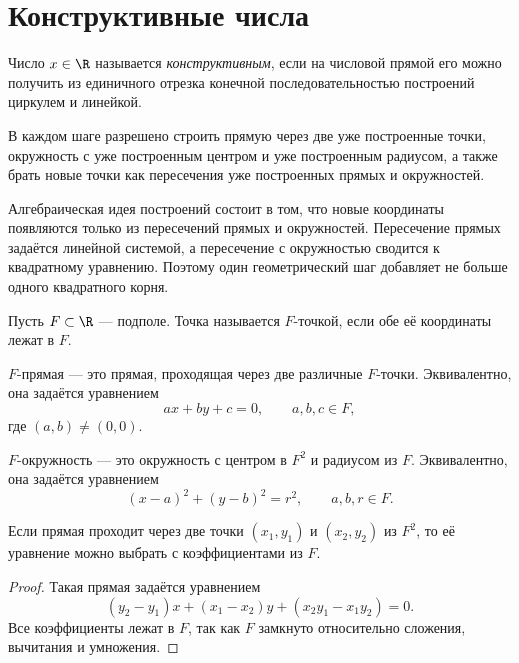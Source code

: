 \section{Конструктивные числа}

\begin{definition}
    Число $x \in \R$ называется \emph{конструктивным}, если на числовой прямой его можно получить из единичного отрезка конечной последовательностью
    построений циркулем и линейкой.


    В каждом шаге разрешено строить прямую через две уже построенные точки, окружность с уже построенным центром и уже построенным радиусом,
    а также брать новые точки как пересечения уже построенных прямых и окружностей.

\end{definition}

\begin{remark}
    Алгебраическая идея построений состоит в том, что новые координаты появляются только из пересечений прямых и окружностей.
    Пересечение прямых задаётся линейной системой, а пересечение с окружностью сводится к квадратному уравнению.
    Поэтому один геометрический шаг добавляет не больше одного квадратного корня.

\end{remark}

\begin{definition}
    Пусть $F \subset \R$ --- подполе. Точка называется $F$-точкой, если обе её координаты лежат в $F$.

    $F$-прямая --- это прямая, проходящая через две различные $F$-точки. Эквивалентно, она задаётся уравнением
    \[
        ax + by + c = 0, \qquad a,b,c \in F,
    \]
    где $(a,b) \neq (0,0)$.

    $F$-окружность --- это окружность с центром в $F^2$ и радиусом из $F$. Эквивалентно, она задаётся уравнением
    \[
        (x-a)^2 + (y-b)^2 = r^2, \qquad a,b,r \in F.
    \]
\end{definition}

\begin{stmt}
    Если прямая проходит через две точки $(x_1,y_1)$ и $(x_2,y_2)$ из $F^2$, то её уравнение можно выбрать с коэффициентами из $F$.

    \begin{proof}
        Такая прямая задаётся уравнением
        \[
            (y_2-y_1)x + (x_1-x_2)y + (x_2y_1-x_1y_2)=0.
        \]
        Все коэффициенты лежат в $F$, так как $F$ замкнуто относительно сложения, вычитания и умножения.
    \end{proof}
\end{stmt}

